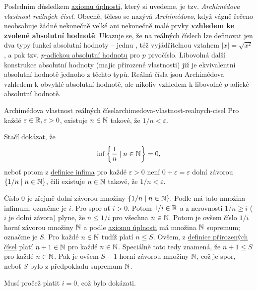 Posledním důsledkem \hyperref[prop:axiom-uplnosti]{axiomu úplnosti}, který si
uvedeme, je tzv. \emph{Archimédova vlastnost reálných čísel}. Obecně, těleso se
nazývá \emph{Archimédovo}, když vágně řečeno neobsahuje žádné nekonečně velké
ani nekonečně malé prvky \textbf{vzhledem ke zvolené absolutní hodnotě}. Ukazuje
se, že na reálných číslech lze definovat jen dva typy funkcí absolutní hodnoty
-- jednu , též vyjádřitelnou vztahem $|x| = \sqrt{x^2}$, a pak tzv.
\href{https://en.wikipedia.org/wiki/P-adic_valuation}{$p$-adickou absolutní
hodnotu} pro $p$ prvočíslo. Libovolná další konstrukce absolutní hodnoty
(majíc přirozené vlastnosti) již je ekvivalentní absolutní hodnotě jednoho z
těchto typů. Reálná čísla jsou Archimédova vzhledem k obvyklé absolutní hodnotě,
ale nikoliv vzhledem k libovolné $p$-adické absolutní hodnotě.

\begin{lemma}{Archimédova vlastnost reálných
 čísel}{archimedova-vlastnost-realnych-cisel}
 Pro každé $\varepsilon \in \mathbb{R}, \varepsilon>0$, existuje $n \in \mathbb{N}$ takové, že
 $1 / n < \varepsilon$.
\end{lemma}
\begin{lemproof}
 Stačí dokázat, že
 \[
  \inf \left\{\frac{1}{n} \mid n \in \mathbb{N}\right\} = 0,
 \]
 neboť potom z \hyperref[def:supremum-a-infimum]{definice infima} pro každé
 $\varepsilon>0$ není $0 + \varepsilon = \varepsilon$ dolní závorou $\{1 / n
 \mid n \in \mathbb{N}\}$, čili existuje $n \in \mathbb{N}$ takové, že $1 / n < \varepsilon$.

Číslo $0$ je zřejmě dolní závorou množiny $\{1 / n \mid n \in \mathbb{N}\}$. Podle
 má tato množina infimum, označme je $i$. Pro
spor ať $i > 0$. Potom $1 / i \in \mathbb{R}$ a z nerovnosti $1 / n \geq i$ ($i$ je
dolní závora) plyne, že $n \leq 1 / i$ pro všechna $n \in \mathbb{N}$. Potom je ovšem
číslo $1 / i$ horní závorou množiny $\mathbb{N}$ a podle
\hyperref[prop:axiom-uplnosti]{axiomu úplnosti} má množina $\mathbb{N}$ supremum;
označme je $S$. Pro každé $n \in \mathbb{N}$ tudíž platí $n \leq S$. Ovšem, z
\hyperref[def:prirozena-cisla]{definice přirozených čísel} platí $n+1 \in \mathbb{N}$
pro každé $n \in \mathbb{N}$. Speciálně toto tedy znamená, že $n + 1 \leq S$ pro každé
$n \in \mathbb{N}$. Pak je ovšem $S - 1$ horní závorou množiny $\mathbb{N}$, což je spor, neboť
$S$ bylo z předpokladu supremum $\mathbb{N}$.

Musí pročež platit $i = 0$, což bylo dokázati.
\end{lemproof}

